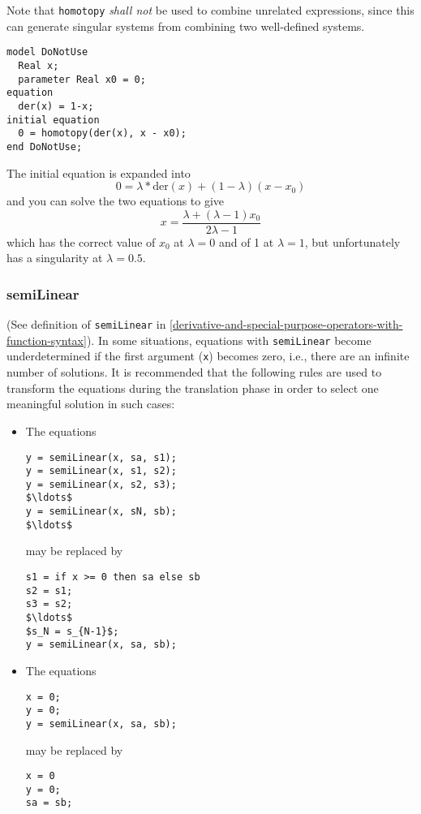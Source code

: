 \begin{example}[4] Note that \lstinline!homotopy! \emph{shall not} be used to
combine unrelated expressions, since this can generate singular systems
from combining two well-defined systems.
\begin{lstlisting}[language=modelica]
model DoNotUse
  Real x;
  parameter Real x0 = 0;
equation
  der(x) = 1-x;
initial equation
  0 = homotopy(der(x), x - x0);
end DoNotUse;
\end{lstlisting}

The initial equation is expanded into
\begin{equation*}
0 = \lambda*\mathrm{der}(x)+(1-\lambda)(x-x_0)
\end{equation*}
and you can solve the two equations to give
\begin{equation*}
x = \frac{\lambda+(\lambda-1)x_0}{2\lambda-1}
\end{equation*}
which has the correct value of $x_0$ at $\lambda = 0$ and of 1 at $\lambda= 1$, but unfortunately has a singularity at $\lambda = 0.5 $.
\end{example}


\subsubsection{semiLinear}\label{semilinear}

(See definition of \lstinline!semiLinear! in \cref{derivative-and-special-purpose-operators-with-function-syntax}). In some situations,
equations with \lstinline!semiLinear! become underdetermined if the
first argument (\lstinline!x!) becomes zero, i.e., there are an infinite number of
solutions. It is recommended that the following rules are used to
transform the equations during the translation phase in order to select
one meaningful solution in such cases:
\begin{itemize}
\item
The equations
\begin{lstlisting}[language=modelica]
y = semiLinear(x, sa, s1);
y = semiLinear(x, s1, s2);
y = semiLinear(x, s2, s3);
$\ldots$
y = semiLinear(x, sN, sb);
$\ldots$
\end{lstlisting}
may be replaced by
\begin{lstlisting}[language=modelica]
s1 = if x >= 0 then sa else sb
s2 = s1;
s3 = s2;
$\ldots$
$s_N = s_{N-1}$;
y = semiLinear(x, sa, sb);
\end{lstlisting}

\item
The equations
\begin{lstlisting}[language=modelica]
x = 0;
y = 0;
y = semiLinear(x, sa, sb);
\end{lstlisting}
may be replaced by
\begin{lstlisting}[language=modelica]
x = 0
y = 0;
sa = sb;
\end{lstlisting}
\end{itemize}

